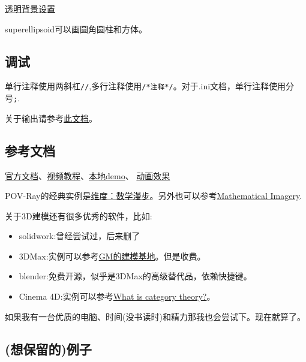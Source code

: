 \documentclass[11pt]{amsart}
\begin{document}
\href{http://www.imagico.de/pov/icons.php}{透明背景设置}

superellipsoid可以画圆角圆柱和方体。
\subsection{调试}
单行注释使用两斜杠\lstinline|//|,多行注释使用\lstinline|/*注释*/|。对于.ini文档，单行注释使用分号\lstinline|;|.

关于输出请参考\href{http://www.f-lohmueller.de/pov_tut/pov_inc/pov_300e.htm}{此文档}。
\subsection{参考文档}
\href{http://www.povray.org/documentation/3.7.0/t2_0.html}{官方文档}、\href{https://www.bilibili.com/video/BV1S4411e7AD}{视频教程}、\href{F://hide/POV/scenes/index.htm}{本地demo}、
\href{http://www.f-lohmueller.de/pov_tut/animate/anim001e.htm}{动画效果}

POV-Ray的经典实例是\href{http://www.dimensions-math.org/Dim_ZH_si.htm}{维度：数学漫步}。另外也可以参考\href{http://www.josleys.com/index.php}{Mathematical Imagery}.

关于3D建模还有很多优秀的软件，比如:
\begin{itemize}
\item solidwork:曾经尝试过，后来删了
\item 3DMax:实例可以参考\href{https://www.bilibili.com/video/BV1hy4y1k7k4}{GM的建模基地}。但是收费。
\item blender:免费开源，似乎是3DMax的高级替代品，依赖快捷键。
\item Cinema 4D:实例可以参考\href{https://www.youtube.com/watch?v=eXBwU9ieLL0}{What is category theory?}。
\end{itemize}
如果我有一台优质的电脑、时间(没书读时)和精力那我也会尝试下。现在就算了。
\subsection{(想保留的)例子}
\end{document}
